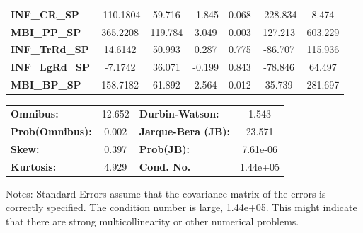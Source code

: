 \begin{center}
\begin{tabular}{lcccccc}
\textbf{INF\_CR\_SP}     &    -110.1804  &       59.716     &    -1.845  &         0.068        &     -228.834    &        8.474     \\
\textbf{MBI\_PP\_SP}     &     365.2208  &      119.784     &     3.049  &         0.003        &      127.213    &      603.229     \\
\textbf{INF\_TrRd\_SP}   &      14.6142  &       50.993     &     0.287  &         0.775        &      -86.707    &      115.936     \\
\textbf{INF\_LgRd\_SP}   &      -7.1742  &       36.071     &    -0.199  &         0.843        &      -78.846    &       64.497     \\
\textbf{MBI\_BP\_SP}     &     158.7182  &       61.892     &     2.564  &         0.012        &       35.739    &      281.697     \\
\bottomrule
\end{tabular}
\begin{tabular}{lclc}
\textbf{Omnibus:}       & 12.652 & \textbf{  Durbin-Watson:     } &    1.543  \\
\textbf{Prob(Omnibus):} &  0.002 & \textbf{  Jarque-Bera (JB):  } &   23.571  \\
\textbf{Skew:}          &  0.397 & \textbf{  Prob(JB):          } & 7.61e-06  \\
\textbf{Kurtosis:}      &  4.929 & \textbf{  Cond. No.          } & 1.44e+05  \\
\bottomrule
\end{tabular}
\end{center}

Notes: \newline
 [1] Standard Errors assume that the covariance matrix of the errors is correctly specified. \newline
 [2] The condition number is large, 1.44e+05. This might indicate that there are \newline
 strong multicollinearity or other numerical problems.